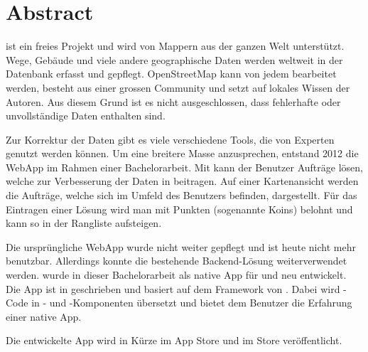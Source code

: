 \chapter*{Abstract}
\thispagestyle{scrheadings}

 ist ein freies Projekt und wird von Mappern aus der ganzen Welt unterstützt.
 Wege, Gebäude und viele andere geographische Daten werden weltweit in der Datenbank erfasst und gepflegt. 
 OpenStreetMap kann von jedem bearbeitet werden, besteht aus einer grossen Community und setzt auf lokales Wissen der Autoren. 
 Aus diesem Grund ist es nicht ausgeschlossen, dass fehlerhafte oder unvollständige Daten enthalten sind.
                    
Zur Korrektur der Daten gibt es viele verschiedene Tools, die von Experten genutzt werden können.
 Um eine breitere Masse anzusprechen, entstand 2012 die \gls{WebApp} \kort{} im Rahmen einer Bachelorarbeit. 
 Mit \kort{} kann der Benutzer Aufträge lösen, welche zur Verbesserung der Daten in  beitragen. 
 Auf einer Kartenansicht werden die Aufträge, welche sich im Umfeld des Benutzers befinden, dargestellt. 
 Für das Eintragen einer Lösung wird man mit Punkten (sogenannte Koins) belohnt und kann so in der Rangliste aufsteigen.
 
Die ursprüngliche \gls{WebApp} wurde nicht weiter gepflegt und ist heute nicht mehr benutzbar. 
Allerdings konnte die bestehende Backend-Lösung weiterverwendet werden. 
\kort{} wurde in dieser Bachelorarbeit als native App für  und  neu entwickelt. 
Die App ist in  geschrieben und basiert auf dem  Framework von . 
Dabei wird -Code in - und -Komponenten übersetzt und bietet dem Benutzer die Erfahrung einer native App.

Die entwickelte App wird in Kürze im  App Store und im  Store veröffentlicht.


 